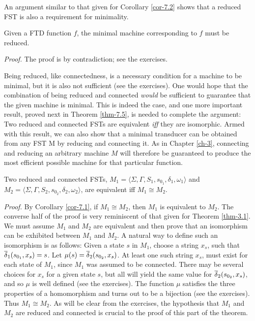 An argument similar to that given for Corollary \ref{cor-7.2} shows that a reduced FST
is also a requirement for minimality.

\begin{cor}\label{cor-7.3}
Given a FTD function $f$, the minimal machine corresponding to $f$ must be
reduced.

\emph{Proof.} The proof is by contradiction; see the exercises.
\end{cor}

Being reduced, like connectedness, is a necessary condition for a machine to
be minimal, but it is also not sufficient (see the exercises). One would hope
that the combination of being reduced and connected \emph{would} be sufficient
to guarantee that the given machine is minimal. This is indeed the case, and one
more important result, proved next in Theorem \ref{thm-7.5}, is needed to complete the
argument: Two reduced and connected FSTs are equivalent \emph{iff} they are
isomorphic. Armed with this result, we can also show that a minimal transducer
can be obtained from any FST M by reducing and connecting it. As in Chapter \ref{ch-3},
connecting and reducing an arbitrary machine $M$ will therefore be guaranteed to
produce the most efficient possible machine for that particular function.

\begin{thm}\label{thm-7.5}
Two reduced and connected FSTs, $M_1=\langle\Sigma,\Gamma,S_1,s_{0_1},\delta_1,
\omega_1\rangle$ and $M_2=\langle\Sigma,\Gamma,S_2,s_{0_2},\delta_2,\omega_2
\rangle$, are equivalent iff $M_1 \cong M_2$.

\emph{Proof.} By Corollary \ref{cor-7.1}, if $M_1 \cong M_2$, then $M_1$ is equivalent to
$M_2$. The converse half of the proof is very reminiscent of that given for
Theorem \ref{thm-3.1}. We must assume $M_1$ and $M_2$ are equivalent and then prove that
an isomorphism can be exhibited between $M_1$ and $M_2$. A natural way to define
such an isomorphism is as follows: Given a state $s$ in $M_1$, choose a string
$x_s$, such that $\overline{\delta}_1(s_{0_1},x_s) = s$. Let $\mu(s)=\overline{\delta}_2(s_{0_2},x_s)$. At
least one such string $x_s$, must exist for each state of $M_1$, since $M_1$ was
assumed to be connected. There may be several choices for $x_s$ for a given
state $s$, but all will yield the same value for $\overline{\delta}_2(s_{0_2},x_s)$, and
so $\mu$ is well defined (see the exercises). The function $\mu$ satisfies the
three properties of a homomorphism and turns out to be a bijection (see the
exercises). Thus $M_1 \cong M_2$. As will be clear from the exercises, the
hypothesis that $M_1$ and $M_2$ are reduced and connected is crucial to the
proof of this part of the theorem.
\end{thm}

